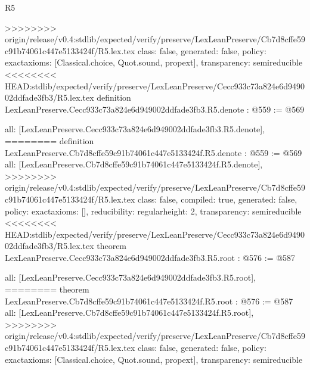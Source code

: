 \begin{lexlean}{R5}
\begin{coremodule}
{{{{>>>>>>>> origin/release/v0.4:stdlib/expected/verify/preserve/LexLeanPreserve/Cb7d8cffe59c91b74061c447e5133424f/R5.lex.tex
  class: false,
  generated: false,
  policy: exact{axioms: [Classical.choice, Quot.sound, propext]},
  transparency: semireducible
}
<<<<<<<< HEAD:stdlib/expected/verify/preserve/LexLeanPreserve/Cecc933c73a824e6d949002ddfade3fb3/R5.lex.tex
definition LexLeanPreserve.Cecc933c73a824e6d949002ddfade3fb3.R5.denote : @559 := @569 {
  all: [LexLeanPreserve.Cecc933c73a824e6d949002ddfade3fb3.R5.denote],
========
definition LexLeanPreserve.Cb7d8cffe59c91b74061c447e5133424f.R5.denote : @559 := @569 {
  all: [LexLeanPreserve.Cb7d8cffe59c91b74061c447e5133424f.R5.denote],
>>>>>>>> origin/release/v0.4:stdlib/expected/verify/preserve/LexLeanPreserve/Cb7d8cffe59c91b74061c447e5133424f/R5.lex.tex
  class: false,
  compiled: true,
  generated: false,
  policy: exact{axioms: []},
  reducibility: regular{height: 2},
  transparency: semireducible
}
<<<<<<<< HEAD:stdlib/expected/verify/preserve/LexLeanPreserve/Cecc933c73a824e6d949002ddfade3fb3/R5.lex.tex
theorem LexLeanPreserve.Cecc933c73a824e6d949002ddfade3fb3.R5.root : @576 := @587 {
  all: [LexLeanPreserve.Cecc933c73a824e6d949002ddfade3fb3.R5.root],
========
theorem LexLeanPreserve.Cb7d8cffe59c91b74061c447e5133424f.R5.root : @576 := @587 {
  all: [LexLeanPreserve.Cb7d8cffe59c91b74061c447e5133424f.R5.root],
>>>>>>>> origin/release/v0.4:stdlib/expected/verify/preserve/LexLeanPreserve/Cb7d8cffe59c91b74061c447e5133424f/R5.lex.tex
  class: false,
  generated: false,
  policy: exact{axioms: [Classical.choice, Quot.sound, propext]},
  transparency: semireducible
}

}}}}}
\end{coremodule}
\end{lexlean}
